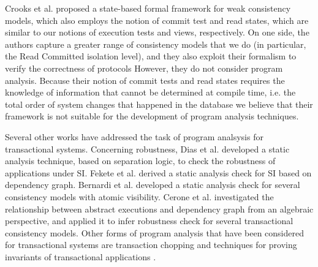 Crooks et al. proposed a state-based formal framework for weak consistency models, 
which also employs the notion of commit test and read states, which are similar 
to our notions of execution tests and views, respectively. On one side, the authors capture 
a greater range of consistency models that we do (in particular, the Read Committed isolation level), 
and they also exploit their formalism to verify the correctness of protocols
However, they do not consider program analysis. Because their notion of commit tests and read states requires 
the knowledge of information that cannot be determined at compile time, i.e. the total order of system changes that happened in the database 
we believe that their framework is not suitable for the development of program analysis techniques.

Several other works have addressed the task of program analsysis for transactional systems. 
Concerning robustness, 
Dias et al. \cite{dias-tm} developed a static analysis technique, based on separation logic, 
to check the robustness of applications under SI. Fekete et al. \cite{fekete-tods} derived 
a static analysis check for SI based on dependency graph. Bernardi et al. \cite{giovanni-concur16} 
developed a static analysis check for several consistency models with atomic visibility. 
Cerone et al. \cite{laws} investigated the relationship between abstract 
executions and dependency graph from an algebraic perspective, and applied it to infer 
robustness check for several transactional consistency models. 
Other forms of program analysis that have been considered for transactional systems 
are transaction chopping \cite{chopping,psi-chopping} and techniques for proving 
invariants of transactional applications \cite{cise,repliss}.
